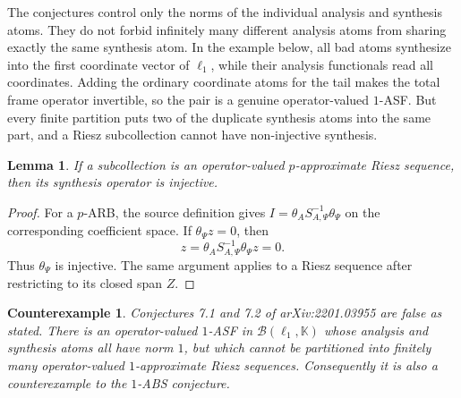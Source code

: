 \documentclass[11pt]{article}
\newtheorem*{theorem}{Counterexample}
\newtheorem*{lemma}{Lemma}
\begin{document}
The conjectures control only the norms of the individual analysis and
synthesis atoms.  They do not forbid infinitely many different analysis atoms
from sharing exactly the same synthesis atom.  In the example below, all bad
atoms synthesize into the first coordinate vector of $\ell_1$, while their
analysis functionals read all coordinates.  Adding the ordinary coordinate
atoms for the tail makes the total frame operator invertible, so the pair is a
genuine operator-valued $1$-ASF.  But every finite partition puts two of the
duplicate synthesis atoms into the same part, and a Riesz subcollection cannot
have non-injective synthesis.

\begin{lemma}
If a subcollection is an operator-valued $p$-approximate Riesz sequence, then
its synthesis operator is injective.
\end{lemma}

\begin{proof}
For a $p$-ARB, the source definition gives
$I=\theta_A S_{A,\Psi}^{-1}\theta_\Psi$ on the corresponding coefficient
space.  If $\theta_\Psi z=0$, then
\[
z=\theta_A S_{A,\Psi}^{-1}\theta_\Psi z=0.
\]
Thus $\theta_\Psi$ is injective.  The same argument applies to a Riesz
sequence after restricting to its closed span $Z$.
\end{proof}

\begin{theorem}
Conjectures 7.1 and 7.2 of arXiv:2201.03955 are false as stated.  There is an
operator-valued $1$-ASF in $\mathcal B(\ell_1,\mathbb K)$ whose analysis and
synthesis atoms all have norm $1$, but which cannot be partitioned into
finitely many operator-valued $1$-approximate Riesz sequences.  Consequently it
is also a counterexample to the $1$-ABS conjecture.
\end{theorem}
\end{document}
